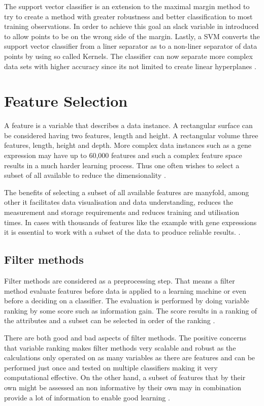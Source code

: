 The support vector classifier is an extension to the maximal margin method to try to create a method with greater robustness and better classification to most training observations. In order to achieve this goal an slack variable in introduced to allow points to be on the wrong side of the margin. Lastly, a SVM converts the support vector classifier from a liner separator as to  a non-liner separator of data points by using so called Kernels. The classifier can now separate more complex data sets with higher accuracy since its not limited to create linear hyperplanes \parencite{James:2014}.


\section{Feature Selection}

A feature is a variable that describes a data instance. A rectangular surface can be considered having two features, length and height. A rectangular volume three features, length, height and depth. More complex data instances such as a gene expression may have up to 60,000 features and such a complex feature space results in a much harder learning process. Thus one often wishes to select a subset of all available to reduce the dimensionality \parencite{guyon2003}.

The benefits of selecting a subset of all available features are manyfold, among other it facilitates data visualisation and data understanding, reduces the measurement and storage requirements and reduces training and utilisation times. In cases with thousands of features like the example with gene expressions it is essential to work with a subset of the data to produce reliable results. \parencite{guyon2003}.


\subsection{Filter methods}

Filter methods are considered as a preprocessing step. That means a filter method evaluate features before data is applied to a learning machine or even before a deciding on a classifier. The evaluation is performed by doing variable ranking by some score such as information gain. The score results in a ranking of the attributes and a subset can be selected in order of the ranking \parencite{guyon2003}.

There are both good and bad aspects of filter methods. The positive concerns that variable ranking makes filter methods very scalable and robust as the calculations only operated on as many variables as there are features and can be performed just once and tested on multiple classifiers making it very computational effective. On the other hand, a subset of features that by their own might be assessed an non informative by their own may in combination provide a lot of information to enable good learning \parencite{guyon2003}.


